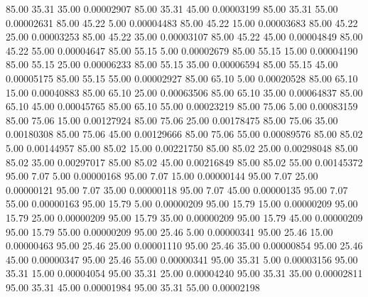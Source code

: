      85.00     35.31     35.00     0.00002907
     85.00     35.31     45.00     0.00003199
     85.00     35.31     55.00     0.00002631
     85.00     45.22      5.00     0.00004483
     85.00     45.22     15.00     0.00003683
     85.00     45.22     25.00     0.00003253
     85.00     45.22     35.00     0.00003107
     85.00     45.22     45.00     0.00004849
     85.00     45.22     55.00     0.00004647
     85.00     55.15      5.00     0.00002679
     85.00     55.15     15.00     0.00004190
     85.00     55.15     25.00     0.00006233
     85.00     55.15     35.00     0.00006594
     85.00     55.15     45.00     0.00005175
     85.00     55.15     55.00     0.00002927
     85.00     65.10      5.00     0.00020528
     85.00     65.10     15.00     0.00040883
     85.00     65.10     25.00     0.00063506
     85.00     65.10     35.00     0.00064837
     85.00     65.10     45.00     0.00045765
     85.00     65.10     55.00     0.00023219
     85.00     75.06      5.00     0.00083159
     85.00     75.06     15.00     0.00127924
     85.00     75.06     25.00     0.00178475
     85.00     75.06     35.00     0.00180308
     85.00     75.06     45.00     0.00129666
     85.00     75.06     55.00     0.00089576
     85.00     85.02      5.00     0.00144957
     85.00     85.02     15.00     0.00221750
     85.00     85.02     25.00     0.00298048
     85.00     85.02     35.00     0.00297017
     85.00     85.02     45.00     0.00216849
     85.00     85.02     55.00     0.00145372
     95.00      7.07      5.00     0.00000168
     95.00      7.07     15.00     0.00000144
     95.00      7.07     25.00     0.00000121
     95.00      7.07     35.00     0.00000118
     95.00      7.07     45.00     0.00000135
     95.00      7.07     55.00     0.00000163
     95.00     15.79      5.00     0.00000209
     95.00     15.79     15.00     0.00000209
     95.00     15.79     25.00     0.00000209
     95.00     15.79     35.00     0.00000209
     95.00     15.79     45.00     0.00000209
     95.00     15.79     55.00     0.00000209
     95.00     25.46      5.00     0.00000341
     95.00     25.46     15.00     0.00000463
     95.00     25.46     25.00     0.00001110
     95.00     25.46     35.00     0.00000854
     95.00     25.46     45.00     0.00000347
     95.00     25.46     55.00     0.00000341
     95.00     35.31      5.00     0.00003156
     95.00     35.31     15.00     0.00004054
     95.00     35.31     25.00     0.00004240
     95.00     35.31     35.00     0.00002811
     95.00     35.31     45.00     0.00001984
     95.00     35.31     55.00     0.00002198
